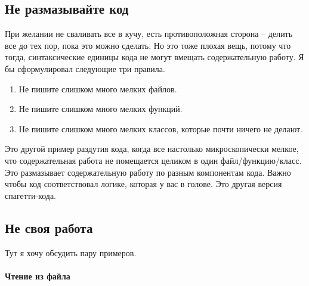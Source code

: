 \subsection{Не размазывайте код}

При желании не сваливать все в кучу, есть противоположная сторона -- делить все до тех пор, пока это можно сделать.
Но это тоже плохая вещь, потому что тогда, синтаксические единицы кода не могут вмещать содержательную работу.
Я бы сформулировал следующие три правила.
\begin{enumerate}
\item Не пишите слишком много мелких файлов.

\item Не пишите слишком много мелких функций.

\item Не пишите слишком много мелких классов, которые почти ничего не делают.
\end{enumerate}
Это другой пример раздутия кода, когда все настолько микроскопически мелкое, что содержательная работа не помещается целиком в один файл/функцию/класс.
Это размазывает содержательную работу по разным компонентам кода.
Важно чтобы код соответствовал логике, которая у вас в голове.
Это другая версия спагетти-кода.

\subsection{Не своя работа}
\label{section::WrongWork}

Тут я хочу обсудить пару примеров.

\paragraph{Чтение из файла}

